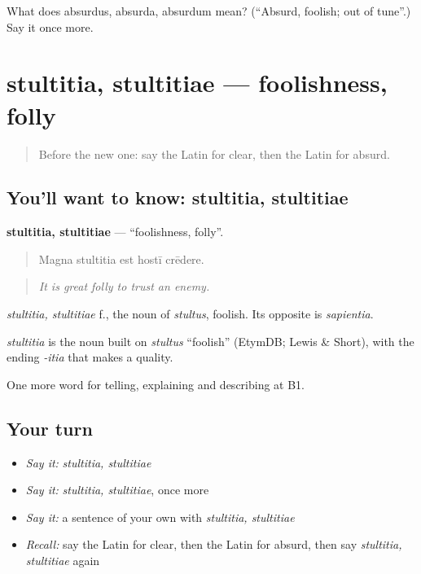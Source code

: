 \begin{tcolorbox}[breakable,colback=teal!4,colframe=teal!35!black,title={Before you move on}]
What does absurdus, absurda, absurdum mean? (\textquotedblleft{}Absurd, foolish; out of tune\textquotedblright{}.) Say it once more.
\end{tcolorbox}
\section[stultitia, stultitiae]{stultitia, stultitiae — foolishness, folly}

\label{lesson:LA-C360-stultitia}



\begin{quote}
Before the new one: say the Latin for clear, then the Latin for absurd.
\end{quote}

\subsection*{You'll want to know: stultitia, stultitiae}
\textbf{stultitia, stultitiae} — \textquotedblleft{}foolishness, folly\textquotedblright{}.

\begin{quote}
Magna stultitia est hostī crēdere.
\end{quote}

\begin{quote}
\emph{It is great folly to trust an enemy.}
\end{quote}

\emph{stultitia, stultitiae} f., the noun of \emph{stultus}, foolish. Its opposite is \emph{sapientia}.

\begin{cousinweb}
\emph{stultitia} is the noun built on \emph{stultus} \textquotedblleft{}foolish\textquotedblright{} (EtymDB; Lewis \& Short), with the ending \emph{-itia} that makes a quality.
\end{cousinweb}

\begin{grammarlens}[title={What you've built}]
One more word for telling, explaining and describing at B1.
\end{grammarlens}

\subsection*{Your turn}
\begin{itemize}
\raggedright
  \item \emph{Say it:} \emph{stultitia, stultitiae}
  \item \emph{Say it:} \emph{stultitia, stultitiae}, once more
  \item \emph{Say it:} a sentence of your own with \emph{stultitia, stultitiae}
  \item \emph{Recall:} say the Latin for clear, then the Latin for absurd, then say \emph{stultitia, stultitiae} again
\end{itemize}

